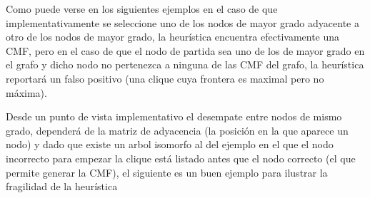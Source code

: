 Como puede verse en los siguientes ejemplos en el caso de que 
implementativamente se seleccione uno de los nodos de mayor grado
adyacente a otro de los nodos de mayor grado, la heur\'istica encuentra
efectivamente una CMF, pero en el caso de que el nodo de partida sea 
uno de los de mayor grado en el grafo y dicho nodo no pertenezca a
ninguna de las CMF del grafo, la heur\'istica reportar\'a un falso 
positivo (una clique cuya frontera es maximal pero no m\'axima).

Desde un punto de vista implementativo el desempate entre nodos de 
mismo grado, depender\'a de la matriz de adyacencia (la posici\'on en
la que aparece un nodo) y dado que existe un arbol isomorfo al del 
ejemplo en el que el nodo incorrecto para empezar la clique est\'a
listado antes que el nodo correcto (el que permite generar la CMF),
el siguiente es un buen ejemplo para ilustrar la fragilidad de la
heur\'istica


